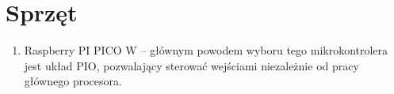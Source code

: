 \section{Sprzęt}
\begin{enumerate}
    \item Raspberry PI PICO W -- głównym powodem wyboru tego mikrokontrolera jest układ PIO, pozwalający sterować wejściami niezależnie od pracy głównego procesora.
\end{enumerate}
